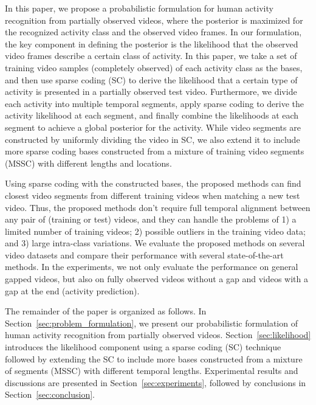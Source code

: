 In this paper, we propose a probabilistic formulation for human activity
recognition from partially observed videos, where the posterior is maximized
for the recognized activity class and the observed video frames. In our
formulation, the key component in defining the posterior is the likelihood that
the observed video frames describe a certain class of activity. In this paper,
we take a set of training video samples (completely observed) of each activity
class as the bases, and then use sparse coding (SC) to derive the likelihood
that a certain {\color{black} type of }activity is presented in a partially
observed test video.  Furthermore, we divide each activity into multiple
temporal segments, apply sparse coding to derive the activity likelihood at
each segment, and finally combine the likelihoods at each segment to achieve a
global posterior for the activity. While video segments are constructed by
uniformly dividing the video in SC, we also extend it to include more sparse
coding bases constructed from a mixture of training video segments (MSSC) with
different lengths and locations.

Using sparse coding with the constructed bases, the proposed methods can find
closest video segments from different training videos when matching a new test
video. Thus, the proposed methods don't require full temporal alignment between
any pair of (training or test) videos, and they can handle the problems of 1) a
limited number of training videos; 2) possible outliers in the training video
data; and 3) large intra-class variations. We evaluate the proposed methods on
several video datasets and compare their performance with several
state-of-the-art methods.  In the experiments, we not only evaluate the
performance on general gapped videos, but also on fully observed videos without
a gap and videos with a gap at the end (activity prediction).

The remainder of the paper is organized as follows. In
Section~\ref{sec:problem_formulation}, we present our probabilistic formulation
of human activity recognition from partially observed
videos. Section~\ref{sec:likelihood} introduces the likelihood component using
a sparse coding (SC) technique followed by extending the SC to include more
bases constructed from a mixture of segments (MSSC) with different temporal
lengths.  Experimental results and discussions are presented in
Section~\ref{sec:experiments}, followed by conclusions in
Section~\ref{sec:conclusion}.

